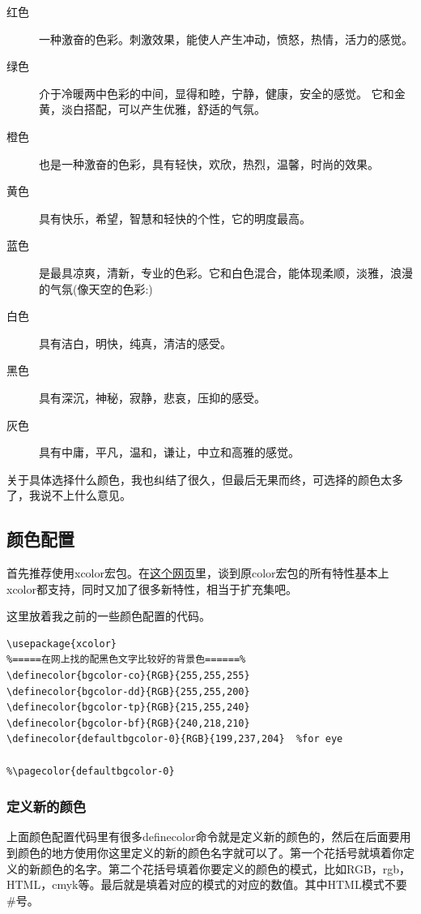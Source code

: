 \documentclass[12pt,oneside]{book}
\begin{document}
\begin{common-format}
\begin{description}
\item[红色] 一种激奋的色彩。刺激效果，能使人产生冲动，愤怒，热情，活力的感觉。
\item[绿色] 介于冷暖两中色彩的中间，显得和睦，宁静，健康，安全的感觉。 它和金黄，淡白搭配，可以产生优雅，舒适的气氛。
\item[橙色] 也是一种激奋的色彩，具有轻快，欢欣，热烈，温馨，时尚的效果。
\item[黄色] 具有快乐，希望，智慧和轻快的个性，它的明度最高。 
\item[蓝色] 是最具凉爽，清新，专业的色彩。它和白色混合，能体现柔顺，淡雅，浪漫的气氛(像天空的色彩:) 
\item[白色] 具有洁白，明快，纯真，清洁的感受。 
\item[黑色] 具有深沉，神秘，寂静，悲哀，压抑的感受。 
\item[灰色] 具有中庸，平凡，温和，谦让，中立和高雅的感觉。 　　
\end{description}
关于具体选择什么颜色，我也纠结了很久，但最后无果而终，可选择的颜色太多了，我说不上什么意见。


\subsection{颜色配置}
首先推荐使用xcolor宏包。在\href{http://tex.stackexchange.com/questions/89763/when-to-use-the-xcolor-package-instead-of-the-color-package}{这个网页}里，谈到原color宏包的所有特性基本上xcolor都支持，同时又加了很多新特性，相当于扩充集吧。

这里放着我之前的一些颜色配置的代码。
\begin{Verbatim}
\usepackage{xcolor}  
%=====在网上找的配黑色文字比较好的背景色======%
\definecolor{bgcolor-co}{RGB}{255,255,255}  
\definecolor{bgcolor-dd}{RGB}{255,255,200}  
\definecolor{bgcolor-tp}{RGB}{215,255,240}  
\definecolor{bgcolor-bf}{RGB}{240,218,210}  
\definecolor{defaultbgcolor-0}{RGB}{199,237,204}  %for eye

%\pagecolor{defaultbgcolor-0}
\end{Verbatim}


\subsubsection{定义新的颜色}
上面颜色配置代码里有很多definecolor命令就是定义新的颜色的，然后在后面要用到颜色的地方使用你这里定义的新的颜色名字就可以了。第一个花括号就填着你定义的新颜色的名字。第二个花括号填着你要定义的颜色的模式，比如RGB，rgb，HTML，cmyk等。最后就是填着对应的模式的对应的数值。其中HTML模式不要\#号。


\end{common-format}
\end{document}
